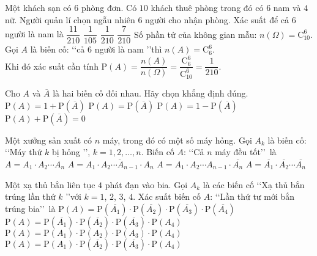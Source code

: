\begin{ex}%
	Một khách sạn có $6$ phòng đơn. Có $10$ khách thuê phòng trong đó có $6$ nam và $4$ nữ. Người quản lí chọn ngẫu nhiên $6$ người cho nhận phòng. Xác suất để cả $6$ người là nam là
	\choice
	{$\dfrac{11}{210}$}
	{$\dfrac{1}{105}$}
	{\True $\dfrac{1}{210}$}
	{$\dfrac{7}{210}$}
	\loigiai
	{
		Số phần tử của không gian mẫu: $n(\Omega)=\mathrm{C}^6_{10}$.\\	
		Gọi $A$ là biến cố: \lq\lq  cả $6$ người là nam \rq\rq thì $n(A)=\mathrm{C}^6_{6}$.\\
		Khi đó xác suất cần tính $\mathrm{P}(A)=\dfrac{n(A)}{n(\Omega)} =\dfrac{\mathrm{C}^6_{6}}{\mathrm{C}^6_{10}}=\dfrac{1}{210}$.		
	}	
\end{ex}
\begin{ex}%
	Cho $A$ và $\overline{A}$ là hai biến cố đối nhau. Hãy chọn khẳng định đúng.
	\choice
	{$\mathrm{P}(A)=1+\mathrm{P}\left(\overline{A}\right)$}
	{$\mathrm{P}(A)=\mathrm{P}\left(\overline{A}\right)$}
	{\True $\mathrm{P}(A)=1-\mathrm{P}\left(\overline{A}\right)$}
	{$\mathrm{P}(A)+\mathrm{P}\left(\overline{A}\right)=0$}
\end{ex}
\begin{ex}%
	Một xưởng sản xuất có $n$ máy, trong đó có một số máy hỏng. Gọi $A_k$ là biến cố: \lq\lq  Máy thứ $k$ bị hỏng \rq\rq, $k=1,2,\ldots,n$. Biến cố $A$: \lq\lq  Cả $n$ máy đều tốt\rq\rq \, là
	\choice
	{$A=A_1\cdot A_2\cdots A_n$}
	{$A=\overline{A_1\cdot A_2\cdots  A_{n-1}\cdot A_n}$}
	{$A=A_1\cdot A_2\cdots A_{n-1}\cdot\overline{A_n}$}
	{\True $A=\overline{A_1}\cdot\overline{A_2}\cdots \overline{A_n}$}
\end{ex}
\begin{ex}%
	Một xạ thủ bắn liên tục $4$ phát đạn vào bia. Gọi $A_k$ là các biến cố \lq\lq  Xạ thủ bắn trúng lần thứ $k$ \rq\rq với $k=1$, $2$, $3$, $4$. Xác suất biến cố $A$: \lq\lq  Lần thứ tư mới bắn trúng bia\rq\rq \, là
	\choice
	{$\mathrm{P}(A)=\mathrm{P}(\overline{A_1})\cdot \mathrm{P}(\overline{A_2})\cdot \mathrm{P}(\overline{A_3})\cdot \mathrm{P}(\overline{A_4})$}
	{\True $\mathrm{P}(A)=\mathrm{P}(\overline{A_1})\cdot \mathrm{P}(\overline{A_2})\cdot \mathrm{P}(\overline{A_3})\cdot \mathrm{P}(A_4)$}
	{$\mathrm{P}(A)=\mathrm{P}(A_1)\cdot \mathrm{P}(A_2)\cdot \mathrm{P}(A_3)\cdot \mathrm{P}(A_4)$}
	{$\mathrm{P}(A)=\mathrm{P}(A_1)\cdot \mathrm{P}(\overline{A_2})\cdot \mathrm{P}(\overline{A_3})\cdot \mathrm{P}(A_4)$}
\end{ex}
